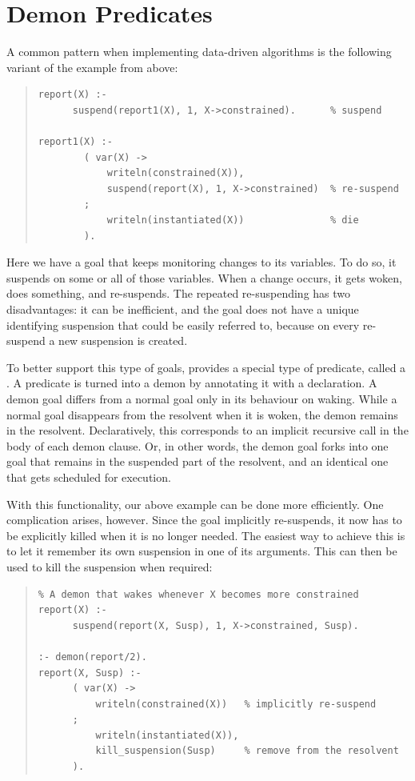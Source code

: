 \section{Demon Predicates}
\label{secdemon}%
A common pattern when implementing data-driven algorithms is the following
variant of the  example from above:
\begin{quote}
\begin{verbatim}
report(X) :-
      suspend(report1(X), 1, X->constrained).      % suspend

report1(X) :-
        ( var(X) ->
            writeln(constrained(X)),
            suspend(report(X), 1, X->constrained)  % re-suspend
        ;
            writeln(instantiated(X))               % die
        ).
\end{verbatim}
\end{quote}
Here we have a goal that keeps monitoring changes to its variables.
To do so, it suspends on some or all of those variables.
When a change occurs, it gets woken, does something, and re-suspends.
The repeated re-suspending has two disadvantages: it can be inefficient,
and the goal does not have a unique identifying suspension that could be
easily referred to, because on every re-suspend a new suspension is created.

To better support this type of goals, {\eclipse} provides a special type
of predicate, called a . A predicate is turned into a
demon by annotating it with a
declaration.
A demon goal differs from a normal goal only in its behaviour on
waking. While a normal goal disappears from the resolvent when it is
woken, the demon remains in the resolvent.
Declaratively, this corresponds to an implicit recursive call in
the body of each demon clause.
Or, in other words, the demon goal forks into one goal that remains in the
suspended part of the resolvent, and an identical one
that gets scheduled for execution.

With this functionality, our above example can be done more
efficiently. One complication arises, however. Since the goal
implicitly re-suspends, it now has to be explicitly killed when
it is no longer needed. The easiest way to achieve this is to
let it remember its own suspension in one of its arguments.
This can then be used to kill the suspension when required:
\begin{quote}
\begin{verbatim}
% A demon that wakes whenever X becomes more constrained
report(X) :-
      suspend(report(X, Susp), 1, X->constrained, Susp).

:- demon(report/2).
report(X, Susp) :-
      ( var(X) ->
          writeln(constrained(X))   % implicitly re-suspend
      ;
          writeln(instantiated(X)),
          kill_suspension(Susp)     % remove from the resolvent
      ).
\end{verbatim}
\end{quote}


